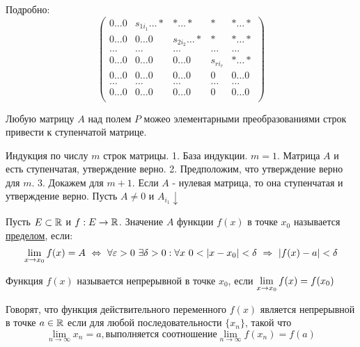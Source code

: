 Подробно:\\
$$\begin{pmatrix}
  0\ldots0 & s_{1i_1}\ldots* & *\ldots* & * & *\ldots* \\
  0\ldots0 & 0\ldots0 & s_{2i_2}\ldots* & * & *\ldots* \\
  \ldots & \ldots & \ldots & \ldots & \ldots \\
  0\ldots0 & 0\ldots0 & 0\ldots0 & s_{ri_r} & *\ldots* \\
  0\ldots0 & 0\ldots0 & 0\ldots0 & 0 & 0\ldots0 \\
  \ldots & \ldots & \ldots & \ldots & \ldots \\
  0\ldots0 & 0\ldots0 & 0\ldots0 & 0 & 0\ldots0 \\
\end{pmatrix}$$%

\begin{proofs}
	Любую матрицу $A$ над полем $P$ можео элементарными преобразованиями строк привести к ступенчатой матрице.
	\begin{dokvo}
    Индукция по числу $m$ строк матрицы.
    1. База индукции. $m = 1$. Матрица $A$ и есть ступенчатая, утверждение верно.
    2. Предположим, что утверждение верно для $m$.
    3. Докажем для $m + 1$.
    Если $A$ - нулевая матрица, то она ступенчатая и утверждение верно.
    Пусть $A \neq 0$ и $A_{i_1}\downarrow$
	\end{dokvo}
\end{proofs}

\begin{DEF}
	Пусть $E \subset \mathbb{R}$ и $f: E \to \mathbb{R}$. Значение $A$ функции $f(x)$ в точке $x_0$ называется \underline{пределом}, если:
	$$\lim_{x\to x_0} f(x) = A \ \Leftrightarrow \ \forall \varepsilon > 0 \ \exists \delta > 0: \forall x \ 0 < \left| x - x_0\right| < \delta \ \Rightarrow \ \left| f(x) - a\right| < \delta$$
\end{DEF}

\begin{DEF}
	Функция $f(x)$ называется непрерывной в точке $x_0$, если $\lim\limits_{x \to x_0}f(x) = f(x_0)$
\end{DEF}

\begin{DEF}
	Говорят, что функция действительного переменного $f(x)$ является непрерывной в точке $a \in \mathbb{R}$ если для любой последовательности $\{x_n\}$, такой что
	$$\lim_{n \to \infty}x_n = a, \text{выполняется соотношение} \lim_{n \to \infty}f(x_n) = f(a)$$
\end{DEF}

